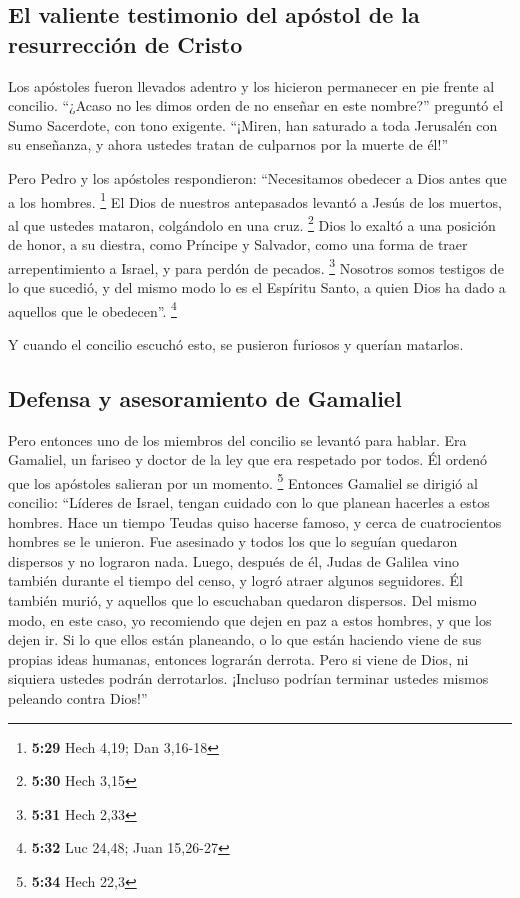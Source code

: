 \hypertarget{el-valiente-testimonio-del-apuxf3stol-de-la-resurrecciuxf3n-de-cristo}{%
\subsection{El valiente testimonio del apóstol de la resurrección de
Cristo}\label{el-valiente-testimonio-del-apuxf3stol-de-la-resurrecciuxf3n-de-cristo}}

 Los apóstoles fueron llevados adentro y los hicieron
permanecer en pie frente al concilio.  ``¿Acaso no les
dimos orden de no enseñar en este nombre?'' preguntó el Sumo Sacerdote,
con tono exigente. ``¡Miren, han saturado a toda Jerusalén con su
enseñanza, y ahora ustedes tratan de culparnos por la muerte de él!''

 Pero Pedro y los apóstoles respondieron: ``Necesitamos
obedecer a Dios antes que a los hombres. \footnote{\textbf{5:29} Hech
  4,19; Dan 3,16-18}  El Dios de nuestros antepasados
levantó a Jesús de los muertos, al que ustedes mataron, colgándolo en
una cruz. \footnote{\textbf{5:30} Hech 3,15}  Dios lo
exaltó a una posición de honor, a su diestra, como Príncipe y Salvador,
como una forma de traer arrepentimiento a Israel, y para perdón de
pecados. \footnote{\textbf{5:31} Hech 2,33}  Nosotros
somos testigos de lo que sucedió, y del mismo modo lo es el Espíritu
Santo, a quien Dios ha dado a aquellos que le obedecen''. \footnote{\textbf{5:32}
  Luc 24,48; Juan 15,26-27}

 Y cuando el concilio escuchó esto, se pusieron furiosos
y querían matarlos.

\hypertarget{defensa-y-asesoramiento-de-gamaliel}{%
\subsection{Defensa y asesoramiento de
Gamaliel}\label{defensa-y-asesoramiento-de-gamaliel}}

 Pero entonces uno de los miembros del concilio se
levantó para hablar. Era Gamaliel, un fariseo y doctor de la ley que era
respetado por todos. Él ordenó que los apóstoles salieran por un
momento. \footnote{\textbf{5:34} Hech 22,3}  Entonces
Gamaliel se dirigió al concilio: ``Líderes de Israel, tengan cuidado con
lo que planean hacerles a estos hombres.  Hace un tiempo
Teudas quiso hacerse famoso, y cerca de cuatrocientos hombres se le
unieron. Fue asesinado y todos los que lo seguían quedaron dispersos y
no lograron nada.  Luego, después de él, Judas de Galilea
vino también durante el tiempo del censo, y logró atraer algunos
seguidores. Él también murió, y aquellos que lo escuchaban quedaron
dispersos.  Del mismo modo, en este caso, yo recomiendo
que dejen en paz a estos hombres, y que los dejen ir. Si lo que ellos
están planeando, o lo que están haciendo viene de sus propias ideas
humanas, entonces lograrán derrota.  Pero si viene de
Dios, ni siquiera ustedes podrán derrotarlos. ¡Incluso podrían terminar
ustedes mismos peleando contra Dios!''

